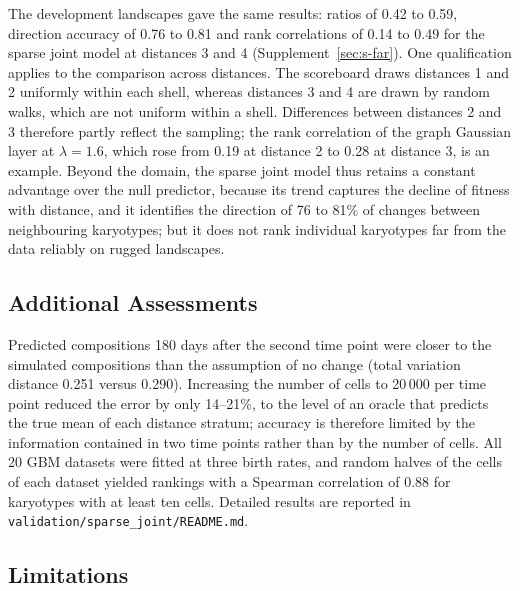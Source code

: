 \documentclass[11pt]{article}
\begin{document}
The development landscapes gave the same results: ratios of 0.42 to 0.59,
direction accuracy of 0.76 to 0.81 and rank correlations of 0.14 to 0.49 for
the sparse joint model at distances 3 and 4 (Supplement~\ref{sec:s-far}). One qualification applies to the
comparison across distances. The scoreboard draws distances 1 and 2
uniformly within each shell, whereas distances 3 and 4 are drawn by random
walks, which are not uniform within a shell. Differences between distances 2
and 3 therefore partly reflect the sampling; the rank correlation of the graph
Gaussian layer at $\lambda=1.6$, which rose from 0.19 at distance 2 to 0.28
at distance 3, is an example. Beyond the domain, the sparse joint model thus
retains a constant advantage over the null predictor, because its trend
captures the decline of fitness with distance, and it identifies the
direction of 76 to 81\% of changes between neighbouring karyotypes; but
it does not rank individual karyotypes far from the data reliably on rugged
landscapes.

\subsection{Additional Assessments}
\label{sec:val-additional}

Predicted compositions 180 days after the second time point were closer to the
simulated compositions than the assumption of no change (total variation
distance 0.251 versus 0.290). Increasing the number of cells to 20\,000 per
time point reduced the error by only 14--21\%, to the level of an oracle that
predicts the true mean of each distance stratum; accuracy is therefore limited
by the information contained in two time points rather than by the number of cells.
All 20 GBM datasets were fitted at three birth rates, and random halves of
the cells of each dataset yielded rankings with a Spearman correlation of 0.88 for
karyotypes with at least ten cells. Detailed results are reported in
\texttt{validation/sparse\_joint/README.md}.

\subsection{Limitations}
\label{sec:val-limitations}
\end{document}
